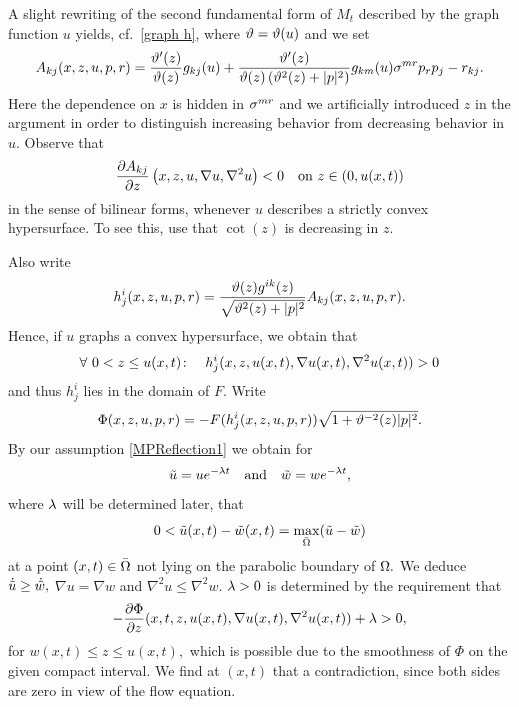 \documentclass{amsart}
\begin{document}
{A slight rewriting of the second fundamental form of $M_t$ described by the graph function $u$ yields, cf.~\eqref{graph h},
 where $\vt=\vt(u)$ and we set
 $$A_{kj}(x,z,u,p,r)=\fr{\vt'(z)}{\vt(z)}g_{kj}(u)+\fr{\vt'(z)}{\vt(z)\br{\vt^2(z)+|p|^2}}g_{km}(u)\s^{mr}p_rp_j-r_{kj}.$$
 Here the dependence on $x$ is hidden in $\s^{mr}$ and we artificially introduced $z$ in the argument in order to distinguish increasing behavior from decreasing behavior in $u.$ Observe that
 $$\fr{\del A_{kj}}{\del z}\br{x,z,u,\nabla u,\nabla^2u}<0\quad\text{on}~ z\in(0,u(x,t))$$
 in the sense of bilinear forms, whenever $u$ describes a strictly convex hypersurface. To see this, use that $\cot(z)$ is decreasing in $z.$

Also write
$$h^i_j(x,z,u,p,r)=\fr{\vt(z)g^{ik}(z)}{\sqrt{\vt^2(z)+|p|^2}}A_{kj}(x,z,u,p,r).$$
Hence, if $u$ graphs a convex hypersurface, we obtain that
$$\forall~ 0<z\leq u(x,t)\cn\quad h^i_j(x,z,u(x,t),\nabla u(x,t),\nabla^2u(x,t))>0$$
 and thus $h^i_j$ lies in the domain of $F.$ Write
  $$\Phi(x,z,u,p,r)=-F(h^i_j(x,z,u,p,r))\sqrt{1+\vt^{-2}(z)|p|^2}.$$
By our assumption \eqref{MPReflection1} we obtain for 
 $$\~u=ue^{-\l t}\quad\text{and}\quad \~w=we^{-\l t},$$
 where $\l$ will be determined later, that
 $$0<\~u(x,t)-\~w(x,t)=\max_{\-\O}(\~u-\~w)$$
 at a point $(x,t)\in\-\O$ not lying on the parabolic boundary of $\O.$ We deduce $\dot{\~u}\geq \dot{\~w},$ $\nabla u=\nabla w$ and $\nabla^2u\leq \nabla^2w.$ 
$\l>0$ is determined by the requirement that
$$-\fr{\del\Phi}{\del z}(x,t,z,u(x,t),\nabla u(x,t),\nabla^2 u(x,t))+\l>0,
$$
for $w(x,t)\leq z\leq u(x,t),$ which is possible due to the smoothness of $\Phi$ on the given compact interval. We find at $(x,t)$ that
 a contradiction, since both sides are zero in view of the flow equation.
}
\end{document}
